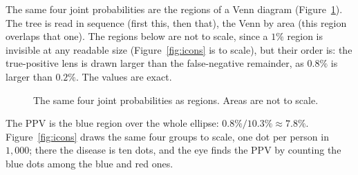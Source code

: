 \documentclass[11pt]{article}
\begin{document}
The same four joint probabilities are the regions of a Venn diagram (Figure~\ref{fig:venn}). The tree is read in sequence (first this, then that), the Venn by area (this region overlaps that one). The regions below are not to scale, since a $1\%$ region is invisible at any readable size (Figure~\ref{fig:icons} is to scale), but their order is: the true-positive lens is drawn larger than the false-negative remainder, as $0.8\%$ is larger than $0.2\%$. The values are exact.

\begin{figure}[H]
\centering
{}
\caption{The same four joint probabilities as regions. Areas are not to scale.}
\label{fig:venn}
\end{figure}

The PPV is the blue region over the whole ellipse: $0.8\% / 10.3\% \approx 7.8\%$. Figure~\ref{fig:icons} draws the same four groups to scale, one dot per person in $1{,}000$; there the disease is ten dots, and the eye finds the PPV by counting the blue dots among the blue and red ones.
\end{document}
